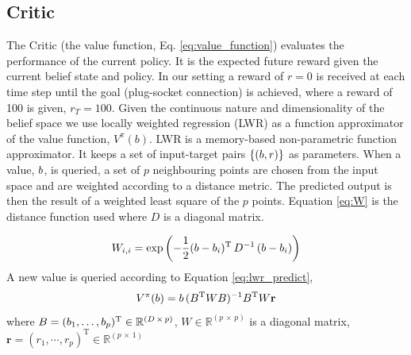 \subsection{Critic}

% 
%


The Critic (the value function, Eq. \ref{eq:value_function}) evaluates 
the performance of the current policy. It is the expected future reward given the current 
belief state and policy.
In our setting a reward of $r=0$ is received at each time step
until the goal (plug-socket connection) is achieved, where a reward of 100 is given, $r_{T}=100$.
Given the continuous nature and dimensionality of the belief space we use locally weighted regression \cite{Atkeson97locallyweighted}
(LWR) as a function approximator of the value function, $V^{\pi}(b)$. LWR is a memory-based non-parametric function 
approximator. It keeps a set of input-target pairs $\{(b,r)\}$ as parameters. When a value, $b$, is 
queried, a set of $p$ neighbouring points are chosen from the input space and are 
weighted according to a distance metric. The predicted output is then the result of a weighted 
least square of the $p$ points. Equation \ref{eq:W} is the distance function used where 
$D$ is a diagonal matrix.

\begin{equation}\label{eq:W}
 W_{i,i}  = \exp\left(-\frac{1}{2}(b - b_i)^{\mathrm{T}}\, D^{-1} \, (b - b_i) \right)
\end{equation}
A new value is queried according to Equation \ref{eq:lwr_predict},
\begin{equation}\label{eq:lwr_predict}
  V^{\pi}(b) = b \,(B^{\mathrm{T}} W B)^{-1} B^{\mathrm{T}} W \mathbf{r}
\end{equation}
where $B = (b_1,\dots,b_p)^{\mathrm{T}} \in \mathbb{R}^{(D\, \times\, p)}$, $W \in \mathbb{R}^{(p\, \times\, p)}$ is
a diagonal matrix, $\mathbf{r} = (r_1,\cdots,r_p)^{\mathrm{T}} \in \mathbb{R}^{(p\, \times\, 1)}$


